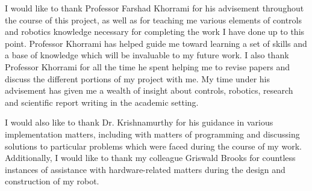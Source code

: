 \clearpage
\vspace*{\fill}
	\begin{center}
		\begin{minipage}{\textwidth}
			\hspace{5mm} 
			I would like to thank Professor Farshad Khorrami for his advisement throughout the course of this project, as well as for teaching me various elements of controls and robotics knowledge necessary for completing the work I have done up to this point. Professor Khorrami has helped guide me toward learning a set of skills and a base of knowledge which will be invaluable to my future work. I also thank Professor Khorrami for all the time he spent helping me to revise papers and discuss the different portions of my project with me. My time under his advisement has given me a wealth of insight about controls, robotics, research and scientific report writing in the academic setting.
			
			\vspace{5mm}
			\hspace{5mm} 
			I would also like to thank Dr. Krishnamurthy for his guidance in various implementation matters, including with matters of programming and discussing solutions to particular problems which were faced during the course of my work. Additionally, I would like to thank my colleague Griswald Brooks for countless instances of assistance with hardware-related matters during the design and construction of my robot. 
		\end{minipage}
	\end{center}
\vfill %
\clearpage
